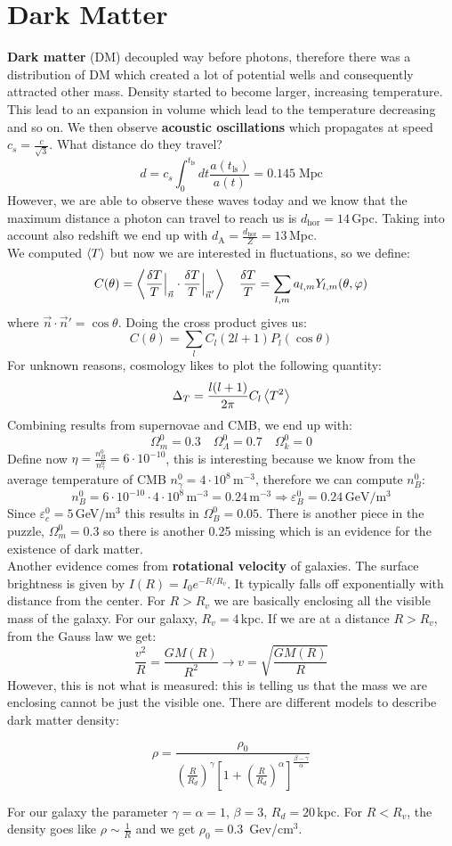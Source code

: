 \documentclass[10.75pt,a4paper,openright,bottom=2cm]{article}
\newcommand{\beginbox}[1]{\begin{tcolorbox}[width=\textwidth,colback={black!40},title={#1},colbacktitle={purple!55},coltitle=black]}
\renewcommand{\endbox}{\end{tcolorbox}\noindent}
\begin{document}
\section{Dark Matter}
\textbf{Dark matter} (DM) decoupled way before photons, therefore there was a distribution of DM which created a lot of potential wells and consequently attracted other mass. Density started to become larger, increasing temperature. This lead to an expansion in volume which lead to the temperature decreasing and so on. We then observe \textbf{acoustic oscillations} which propagates at speed $c_s=\frac{c}{\sqrt{3}}$. What distance do they travel?
\[
d=c_s\int_0^{t_{\text{ls}}}dt\frac{a(t_{\text{ls}})}{a(t)}=0.145\;\text{Mpc}
\]
However, we are able to observe these waves today and we know that the maximum distance a photon can travel to reach us is $d_{\text{hor}}=14$\,Gpc. Taking into account also redshift we end up with $d_{\text{A}}=\frac{d_{\text{hor}}}{Z}=13$\,Mpc.\\
We computed $\Braket{T}$ but now we are interested in fluctuations, so we define:
\[
C(\theta)=\Braket{\frac{\delta T}{T}\Bigr|_{\substack{\Vec{n}}}\cdot\frac{\delta T}{T}\Bigr|_{\substack{\Vec{n}'}}} \quad \frac{\delta T}{T}=\sum_{l,m}a_{l,m}Y_{l,m}(\theta,\varphi)
\]
where $\Vec{n}\cdot\Vec{n}'=\cos\theta$. Doing the cross product gives us:
\[
C(\theta)=\sum_lC_l(2l+1)P_l(\cos\theta)
\]
For unknown reasons, cosmology likes to plot the following quantity:
\[
\Delta_T=\frac{l(l+1)}{2\pi}C_l\Braket{T^2}
\]
Combining results from supernovae and CMB, we end up with:
\[
\Omega_m^0=0.3 \quad \Omega_\Lambda^0=0.7 \quad \Omega_k^0=0
\]
Define now $\eta=\frac{n_B^0}{n_\gamma^0}=6\cdot10^{-10}$, this is interesting because we know from the average temperature of CMB $n_\gamma^0=4\cdot10^8$\,m$^{-3}$, therefore we can compute $n_B^0$:
\[
n_B^0=6\cdot10^{-10}\cdot4\cdot10^8\,\text{m$^{-3}$}=0.24\,\text{m$^{-3}$}\Rightarrow\varepsilon_B^0=0.24\,\text{GeV/m$^3$}
\]
Since $\varepsilon_c^0=5$\,GeV/m$^3$ this results in $\Omega_B^0=0.05$. There is another piece in the puzzle, $\Omega_m^0=0.3$ so there is another 0.25 missing which is an evidence for the existence of dark matter.\\
Another evidence comes from \textbf{rotational velocity} of galaxies. The surface brightness is given by $I(R)=I_0e^{-R/R_v}$. It typically falls off exponentially with distance from the center. For $R>R_v$ we are basically enclosing all the visible mass of the galaxy. For our galaxy, $R_v=4$\,kpc. If we are at a distance $R>R_v$, from the Gauss law we get:
\[
\frac{v^2}{R}=\frac{GM(R)}{R^2}\to v=\sqrt{\frac{GM(R)}{R}}
\] 
However, this is not what is measured: this is telling us that the mass we are enclosing cannot be just the visible one. There are different models to describe dark matter density:
\beginbox{Navarro-Frank-White Model}
\[
\rho=\frac{\rho_0}{\left(\frac{R}{R_d}\right)^\gamma\left[1+\left(\frac{R}{R_d}\right)^\alpha\right]^{\frac{\beta-\gamma}{\alpha}}}
\]
\endbox
For our galaxy the parameter $\gamma=\alpha=1$, $\beta=3$, $R_d=20$\,kpc. For $R<R_v$, the density goes like $\rho\sim\frac{1}{R}$ and we get $\rho_0=0.3$\, Gev/cm$^3$. 
\end{document}
